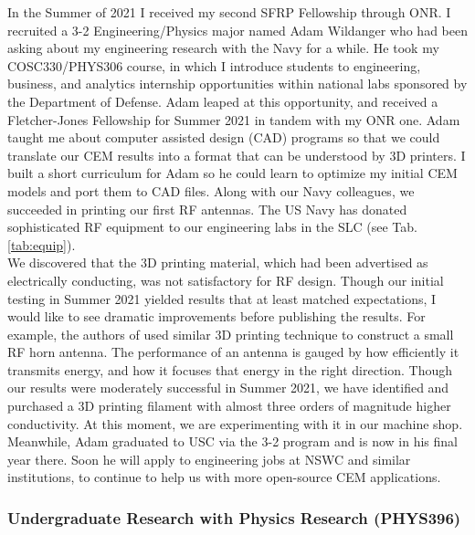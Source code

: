 \documentclass[../../../main.tex]{subfiles}
\begin{document}
In the Summer of 2021 I received my second SFRP Fellowship through ONR.  I recruited a 3-2 Engineering/Physics major named Adam Wildanger who had been asking about my engineering research with the Navy for a while.  He took my COSC330/PHYS306 course, in which I introduce students to engineering, business, and analytics internship opportunities within national labs sponsored by the Department of Defense.  Adam leaped at this opportunity, and received a Fletcher-Jones Fellowship for Summer 2021 in tandem with my ONR one.  Adam taught me about computer assisted design (CAD) programs so that we could translate our CEM results into a format that can be understood by 3D printers.  I built a short curriculum for Adam so he could learn to optimize my initial CEM models and port them to CAD files.  Along with our Navy colleagues, we succeeded in printing our first RF antennas.  The US Navy has donated sophisticated RF equipment to our engineering labs in the SLC (see Tab. \ref{tab:equip}).
\\
\vspace{0.15cm}
We discovered that the 3D printing material, which had been advertised as electrically conducting, was not satisfactory for RF design.  Though our initial testing in Summer 2021 yielded results that at least matched expectations, I would like to see dramatic improvements before publishing the results.  For example, the authors of \cite{10.1109/access.2019.2932912} used similar 3D printing technique to construct a small RF horn antenna.  The performance of an antenna is gauged by how efficiently it transmits energy, and how it focuses that energy in the right direction.  Though our results were moderately successful in Summer 2021, we have identified and purchased a 3D printing filament with almost three orders of magnitude higher conductivity.  At this moment, we are experimenting with it in our machine shop.  Meanwhile, Adam graduated to USC via the 3-2 program and is now in his final year there.  Soon he will apply to engineering jobs at NSWC and similar institutions, to continue to help us with more open-source CEM applications.

\subsubsection{Undergraduate Research with Physics Research (PHYS396)}
\end{document}
